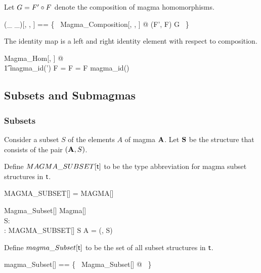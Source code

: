\documentclass{amsart}
\begin{document}
Let $G = F' \mathbin{\circ} F$ denote the composition of magma homomorphisms.

\begin{zed}
	(\_ \compMagma \_)[\genT, \genU, \genV] == \{~ Magma\_Composition[\genT, \genU, \genV] @ (F', F) \mapsto G ~\}
\end{zed}

\begin{remark}
The identity map is a left and right identity element with respect to composition.

\begin{zed}
	\forall Magma\_Hom[\setT, \setU] @ \\
	\t1 magma\_id(\strucA') \compMagma F = F = F \compMagma magma\_id(\strucA)
\end{zed}

\end{remark}

\subsection{Subsets and Submagmas}

\subsubsection{Subsets}

Consider a subset $S$ of the elements $A$ of magma $\mathbf{A}$.
Let $\mathbf{S}$ be the structure that consists of the pair $(\mathbf{A}, S)$.

Define $MAGMA\_SUBSET[\mathsf{t}]$ to be the type abbreviation for magma subset 
structures in $\mathsf{t}$.

\begin{zed}
	MAGMA\_SUBSET[\genT] = MAGMA[\genT] \cross \power \genT
\end{zed}

\begin{schema}{Magma\_Subset}[\genT]
	Magma[\genT] \\
	S: \power \genT \\
	\strucS: MAGMA\_SUBSET[\genT]
\where
	S \subseteq A
\also
	\strucS = (\strucA, S)
\end{schema}

Define $magma\_Subset[\mathsf{t}]$ to be the set of all subset structures in $\mathsf{t}$.

\begin{zed}
	magma\_Subset[\genT] == \{~ Magma\_Subset[\genT] @ \strucS ~\}
\end{zed}
\end{document}
